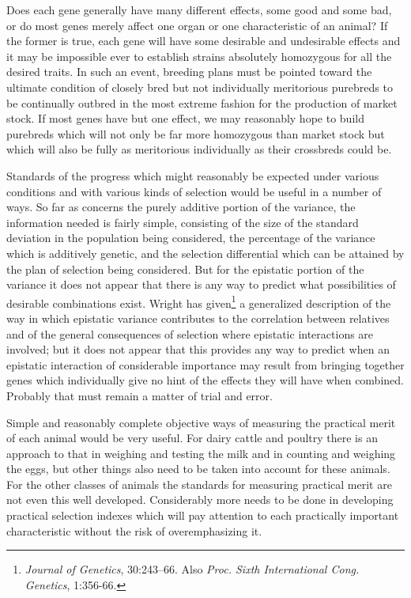 Does each gene generally have many different effects, some good and
some bad, or do most genes merely affect one organ or one characteristic
of an animal? If the former is true, each gene will have some desirable
and undesirable effects and it may be impossible ever to establish strains
absolutely homozygous for all the desired traits. In such an event, breeding
plans must be pointed toward the ultimate condition of closely bred
but not individually meritorious purebreds to be continually outbred
in the most extreme fashion for the production of market stock. If most
genes have but one effect, we may reasonably hope to build purebreds
which will not only be far more homozygous than market stock but
which will also be fully as meritorious individually as their crossbreds
could be.

Standards of the progress which might reasonably be expected
under various conditions and with various kinds of selection would be
useful in a number of ways. So far as concerns the purely additive portion
of the variance, the information needed is fairly simple, consisting
of the size of the standard deviation in the population being considered,
the percentage of the variance which is additively genetic, and the selection
differential which can be attained by the plan of selection being
considered. But for the epistatic portion of the variance it does not
appear that there is any way to predict what possibilities of desirable
combinations exist. Wright has given\footnote{\textit{Journal of Genetics},
30:243--66. Also \textit{Proc. Sixth International Cong. Genetics},
1:356-66.} a generalized description of the way in which epistatic variance
contributes to the correlation between relatives and of the general
consequences of selection where epistatic interactions are involved; but
it does not appear that this provides any way to predict when an epistatic
interaction of considerable importance may result from bringing together
genes which individually give no hint of the effects they will have when
combined. Probably that must remain a matter of trial and error.

Simple and reasonably complete objective ways of measuring the
practical merit of each animal would be very useful. For dairy cattle
and poultry there is an approach to that in weighing and testing the
milk and in counting and weighing the eggs, but other things also need
to be taken into account for these animals. For the other classes of animals
the standards for measuring practical merit are not even this well
developed. Considerably more needs to be done in developing practical
selection indexes which will pay attention to each practically important
characteristic without the risk of overemphasizing it.

